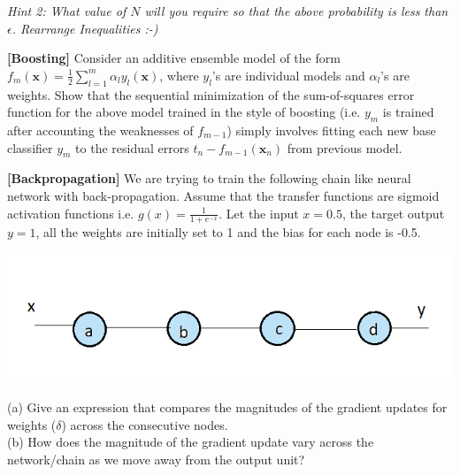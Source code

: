 \documentclass[addpoints,12pt,solution]{exam}
\begin{document}
\begin{questions}
\textit{Hint 2: What value of $N$ will you require so that the above probability is less than $\epsilon$. Rearrange Inequalities :-)}

\begin{solution}
\end{solution}

\question[2] \textbf{[Boosting]} Consider an additive ensemble model of the form $f_m(\mathbf{x}) = \frac{1}{2} \sum_{l=1}^{m} \alpha_l y_l (\mathbf{x})$, where $y_l$'s are individual models and $\alpha_l$'s are weights. Show that the sequential minimization of the sum-of-squares error function for the above model trained in the style of boosting (i.e. $y_m$ is trained after accounting the weaknesses of $f_{m-1}$) simply involves fitting each new base classifier $y_m$ to the residual errors $t_n -f_{m-1}(\mathbf{x}_n)$ from previous model. 

\begin{solution}
\end{solution}

\question[2] \textbf{[Backpropagation]} We are trying to train the following chain like neural network with back-propagation. Assume that the transfer functions are sigmoid activation functions i.e. $g(x) = \frac{1}{1+e^{-x}}$. Let the input $x = 0.5$, the target output $y = 1$, all the weights are initially set to 1 and the bias for each node is -0.5.\\
    \begin{center}
        \includegraphics[scale=0.5]{bp.png}
    \end{center}
(a) Give an expression that compares the magnitudes of the gradient updates for weights ($\delta$) across the consecutive nodes.\\ 
(b) How does the magnitude of the gradient update vary across the network/chain as we move away from the output unit?

\begin{solution}
\end{solution}



\end{questions}
\end{document}
